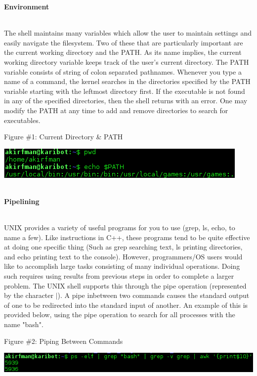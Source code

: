 \documentclass[12pt]{extarticle}
\newenvironment{myindentpar}[1]%
 {\begin{list}{}%
         {\setlength{\leftmargin}{#1}}%
         \item[]%
 }
 {\end{list}}
\begin{document}
\begin{myindentpar}{5mm}

\noindent
\textbf{Environment}

\ \\
The shell maintains many variables which allow the user to maintain settings and easily navigate the filesystem.  Two of these that are particularly important are the current working directory and the PATH.  As its name implies, the current working directory variable keeps track of the user's current directory.  The PATH variable consists of string of colon separated pathnames.  Whenever you type a name of a command, the kernel searches in the directories specified by the PATH variable starting with the leftmost directory first.  If the executable is not found in any of the specified directories, then the shell returns with an error.  One may modify the PATH at any time to add and remove directories to search for executables.  

\begin{center}
    Figure \#1: Current Directory \& PATH
\end{center}
\begin{center}
    \includegraphics{environment.png}
\end{center}

\ \\
\textbf{Pipelining}

\ \\
UNIX provides a variety of useful programs for you to use (grep, ls, echo, to name a few).  Like instructions in C++, these programs tend to be quite effective at doing one specific thing (Such as grep searching text, ls printing directories, and echo printing text to the console).  However, programmers/OS users would like to accomplish large tasks consisting of many individual operations.  Doing such requires using results from previous steps in order to complete a larger problem.  The UNIX shell supports this through the pipe operation (represented by the character $\vert$).  A pipe inbetween two commands causes the standard output of one to be redirected into the standard input of another.  An example of this is provided below, using the pipe operation to search for all processes with the name "bash".  

\begin{center}
    Figure \#2: Piping Between Commands
\end{center}
\begin{center}
    \includegraphics{pipe.png}
\end{center}


\end{myindentpar}
\end{document}
